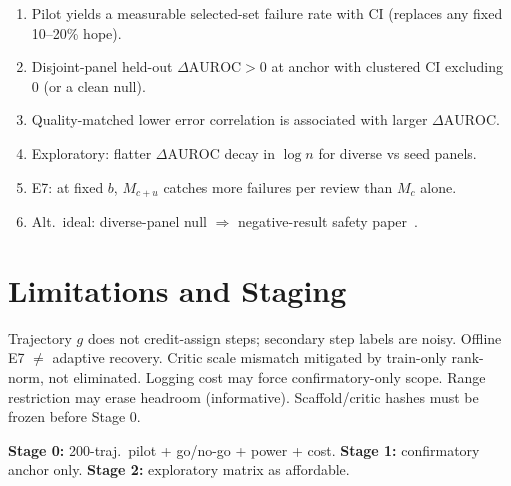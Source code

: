 \documentclass[11pt]{article}
\newcommand{\DeltaAUROC}{\Delta\mathrm{AUROC}}
\begin{document}
\begin{enumerate}[leftmargin=*,itemsep=1pt]
  \item Pilot yields a measurable selected-set failure rate with CI (replaces any fixed 10--20\% hope).
  \item Disjoint-panel held-out $\DeltaAUROC > 0$ at anchor with clustered CI excluding 0 (or a clean null).
  \item Quality-matched lower error correlation is associated with larger $\DeltaAUROC$.
  \item Exploratory: flatter $\DeltaAUROC$ decay in $\log n$ for diverse vs seed panels.
  \item E7: at fixed $b$, $M_{c{+}u}$ catches more failures per review than $M_c$ alone.
  \item Alt.\ ideal: diverse-panel null $\Rightarrow$ negative-result safety paper~\cite{eisenstein}.
\end{enumerate}

\section{Limitations and Staging}

Trajectory $g$ does not credit-assign steps; secondary step labels are noisy.
Offline E7 $\neq$ adaptive recovery.
Critic scale mismatch mitigated by train-only rank-norm, not eliminated.
Logging cost may force confirmatory-only scope.
Range restriction may erase headroom (informative).
Scaffold/critic hashes must be frozen before Stage 0.

\textbf{Stage 0:} 200-traj.\ pilot + go/no-go + power + cost.
\textbf{Stage 1:} confirmatory anchor only.
\textbf{Stage 2:} exploratory matrix as affordable.
\end{document}

